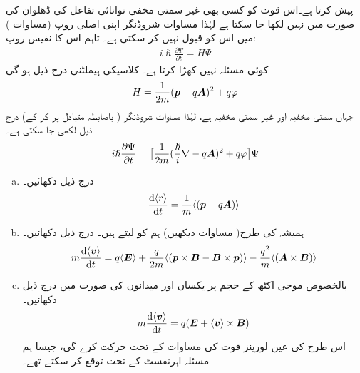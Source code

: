  پیش کرتا ہے۔اس قوت کو کسی بھی غیر سمتی مخفی توانائی تفاعل کی ڈھلوان کی صورت میں نہیں لکھا جا سکتا ہے لہٰذا مساوات شروڈنگر اپنی اصلی روپ (مساوات ) میں اس کو قبول نہیں کر سکتی ہے۔ تاہم اس کا نفیس روپ:
\begin{align}
 i\hslash\frac{\partial\Psi}{\partial t}=H\Psi
\end{align}
کوئی مسئلہ نہیں کھڑا کرتا ہے۔ کلاسیکی ہیملٹنی درج ذیل ہو گی
\begin{align}
 H=\frac{1}{2m}({{\boldsymbol{p}}}-q{{\boldsymbol{A}}})^2+q\varphi
\end{align}
 جہاں  سمتی مخفیہ  اور
  غیر سمتی مخفیہ  ہے، لہٰذا مساوات شروڈنگر 
 ( باضابطہ متبادل  پر کر کے) درج ذیل لکھی جا سکتی ہے۔
\begin{align}\label{مساوات_تین_ابعادی_شروڈنگر_باضابطہ}
 i\hslash\frac{\partial\Psi}{\partial t}=\big [\frac{1}{2m}(\frac{\hslash}{i}\nabla-q{{\boldsymbol{A}}})^2+q\varphi\big ]\Psi
\end{align}
\begin{enumerate}[a.]
\item 
درج ذیل دکھائیں۔
 \begin{align}\label{مساوات_تین_ابعاد_رفتار_توقعاتی_تعلق}
 \frac{\dif\, \langle r \rangle }{\dif t}=\frac{1}{m}\langle(\kvec{p}-q\kvec{A})\rangle
\end{align}
\item
 ہمیشہ کی طرح( مساوات  دیکھیں) ہم  کو  لیتے ہیں۔ درج ذیل دکھائیں۔
\begin{align}
 m\frac{\dif \, \langle \kvec{v} \rangle}{\dif t}=q\langle\kvec{E}\rangle+\frac{q}{2m}\langle(\kvec{p}\times\kvec{B}-\kvec{B}\times\kvec{p})\rangle-\frac{q^2}{m} \langle (\kvec{A}\times\kvec{B})\rangle
\end{align}
\item 
 بالخصوص موجی اکٹھ کے حجم پر یکساں  اور  میدانوں کی صورت میں درج ذیل دکھائیں۔
 \begin{align}
 m\frac{\dif\, \langle \kvec{v}\rangle}{\dif t}=q(\kvec{E}+\langle\kvec{v}\rangle\times\kvec{B})
\end{align}
 اس طرح  کی عین لورینز قوت کی مساوات کے تحت حرکت کرے گی، جیسا ہم مسئلہ اہرنفسٹ کے تحت توقع کر سکتے تھے۔
\end{enumerate}
